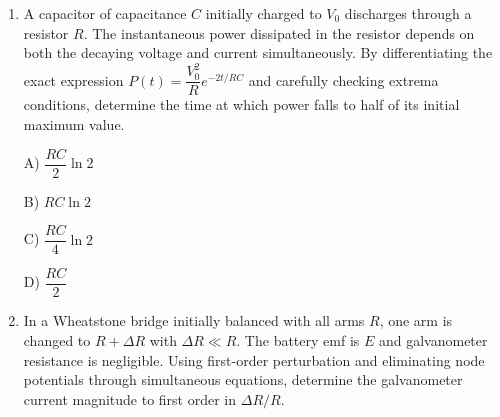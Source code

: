 \documentclass[12pt]{article}
\begin{document}
\begin{enumerate}[leftmargin=*]
\begin{center}

\end{center}
A) $\dfrac{kq}{2\sqrt2\,a^2}$

B) $\dfrac{kq}{\sqrt2\,a^2}$

C) $\dfrac{2kq}{\sqrt2\,a^2}$

D) $\dfrac{kq}{a^2}$

\item A capacitor of capacitance $C$ initially charged to $V_0$ discharges through a resistor $R$. The instantaneous power dissipated in the resistor depends on both the decaying voltage and current simultaneously. By differentiating the exact expression $P(t)=\dfrac{V_0^2}{R}e^{-2t/RC}$ and carefully checking extrema conditions, determine the time at which power falls to half of its initial maximum value.

A) $\dfrac{RC}{2}\ln2$

B) $RC\ln2$

C) $\dfrac{RC}{4}\ln2$

D) $\dfrac{RC}{2}$

\item In a Wheatstone bridge initially balanced with all arms $R$, one arm is changed to $R+\Delta R$ with $\Delta R \ll R$. The battery emf is $E$ and galvanometer resistance is negligible. Using first-order perturbation and eliminating node potentials through simultaneous equations, determine the galvanometer current magnitude to first order in $\Delta R/R$.



\end{enumerate}
\end{document}
